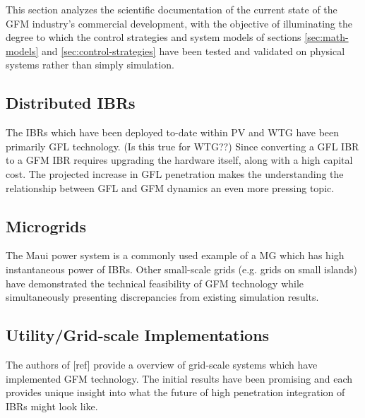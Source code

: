 \label{sec:commericial-demonstrations}

This section analyzes the scientific documentation of the
current state of the GFM industry's commercial development,
with the objective of illuminating the degree to which
the control strategies and system models of sections
\ref{sec:math-models} and \ref{sec:control-strategies}
have been tested and validated on physical systems rather
than simply simulation.

\subsection{Distributed IBRs}
The IBRs which have been deployed to-date within PV and WTG
have been primarily GFL technology. (Is this true for WTG??)
Since converting a GFL IBR to a GFM IBR requires upgrading
the hardware itself, along with a high capital cost. The projected
increase in GFL penetration makes the understanding the relationship
between GFL and GFM dynamics an even more pressing topic.

\subsection{Microgrids}
The Maui power system is a commonly used example of a MG which has 
high instantaneous power of IBRs. Other small-scale  grids
(e.g. grids on small islands) have demonstrated the technical
feasibility of GFM technology while simultaneously presenting 
discrepancies from existing simulation results.

\subsection{Utility/Grid-scale Implementations}
The authors of [ref]\cite{abook}%
provide a overview of grid-scale systems which have implemented GFM
technology. The initial results have been promising and each provides
unique insight into what the future of high penetration integration of
IBRs might look like.
